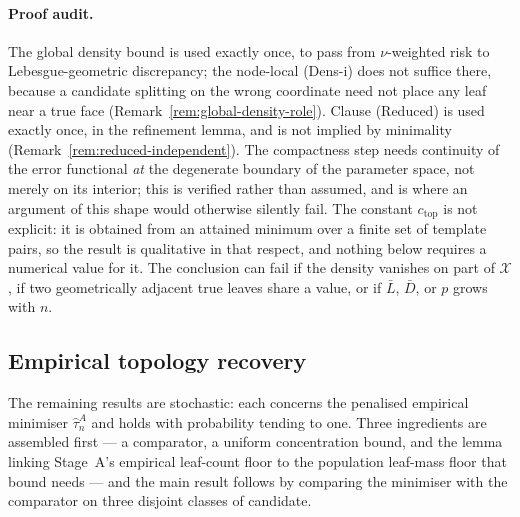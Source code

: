 \documentclass[11pt]{article}
\theoremstyle{plain}
\theoremstyle{definition}
\theoremstyle{remark}
\newcommand{\cX}{\mathcal{X}}
\begin{document}
\paragraph{Proof audit.}
The global density bound is used exactly once, to pass from \(\nu\)-weighted
risk to Lebesgue-geometric discrepancy; the node-local (Dens-i) does not
suffice there, because a candidate splitting on the wrong coordinate need not
place any leaf near a true face (Remark~\ref{rem:global-density-role}).
Clause (Reduced) is used exactly once, in the refinement lemma, and is not
implied by minimality (Remark~\ref{rem:reduced-independent}). The compactness
step needs continuity of the error functional \emph{at} the degenerate
boundary of the parameter space, not merely on its interior; this is verified
rather than assumed, and is where an argument of this shape would otherwise
silently fail. The constant \(c_{\mathrm{top}}\) is not explicit: it is
obtained from an attained minimum over a finite set of template pairs, so the
result is qualitative in that respect, and nothing below requires a numerical
value for it. The conclusion can fail if the density vanishes on part of
\(\cX\), if two geometrically adjacent true leaves share a value, or if
\(\bar L\), \(\bar D\), or \(p\) grows with \(n\).

\subsection{Empirical topology recovery}\label{sec:topology-empirical}

The remaining results are stochastic: each concerns the penalised empirical
minimiser \(\hat\tau^A_n\) and holds with probability tending to one. Three
ingredients are assembled first --- a comparator, a uniform concentration
bound, and the lemma linking Stage~A's empirical leaf-count floor to the
population leaf-mass floor that bound needs --- and the main result follows by
comparing the minimiser with the comparator on three disjoint classes of
candidate.
\end{document}

